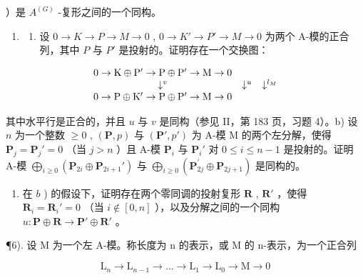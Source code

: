 ）是 \(A^{(G)}\) -复形之间的一个同构。

\begin{enumerate}
\def\labelenumi{\arabic{enumi})}
\setcounter{enumi}{4}
\tightlist
\item
  \begin{enumerate}
  \def\labelenumii{\alph{enumii})}
  \tightlist
  \item
    设 \(0 \to K \to P \to M \to 0\) , \(0 \to K' \to P' \to M \to 0\) 为两个 A-模的正合列，其中 \(P\) 与 \(P'\) 是投射的。证明存在一个交换图：
  \end{enumerate}
\end{enumerate}

\[
\begin{array}{c c c}0 \rightarrow \mathrm{K} \oplus \mathrm{P} ^ {\prime} \rightarrow \mathrm{P} \oplus \mathrm{P} ^ {\prime} \rightarrow \mathrm{M} \rightarrow 0\\\downarrow^ {v}&\downarrow^ {u}&\downarrow^ {l _ {M}}\\0 \rightarrow \mathrm{P} \oplus \mathrm{K} ^ {\prime} \rightarrow \mathrm{P} \oplus \mathrm{P} ^ {\prime} \rightarrow \mathrm{M} \rightarrow 0\end{array}
\]

其中水平行是正合的，并且 \(u\) 与 \(v\) 是同构（参见 II，第 183 页，习题 4）。b) 设 \(n\) 为一个整数 \(\geqslant 0\) , \((\mathbf{P}, p)\) 与 \((\mathbf{P}', p')\) 为 A-模 M 的两个左分解，使得 \(\mathbf{P}_j = \mathbf{P}_j' = 0\) （当 \(j > n\) ）且 A-模 \(\mathbf{P}_i\) 与 \(\mathbf{P}_i'\) 对 \(0 \leqslant i \leqslant n - 1\) 是投射的。证明 A-模 \(\bigoplus_{i \geqslant 0} (\mathbf{P}_{2i} \oplus \mathbf{P}_{2i+1}')\) 与 \(\bigoplus_{i \geqslant 0} (\mathbf{P}_{2j}^{\prime} \oplus \mathbf{P}_{2j+1})\) 是同构的。

\begin{enumerate}
\def\labelenumi{\alph{enumi})}
\setcounter{enumi}{2}
\tightlist
\item
  在 \(b\) ) 的假设下，证明存在两个零同调的投射复形 \(\mathbf{R}\) , \(\mathbf{R}'\) ，使得 \(\mathbf{R}_i = \mathbf{R}_i' = 0\) （当 \(i \notin [0, n]\) ），以及分解之间的一个同构 \(u: \mathbf{P} \oplus \mathbf{R} \to \mathbf{P}' \oplus \mathbf{R}'\) 。
\end{enumerate}

¶6). 设 M 为一个左 A-模。称长度为 n 的表示，或 M 的 n-表示，为一个正合列

\[
\mathrm{L} _ {n} \rightarrow \mathrm{L} _ {n - 1} \rightarrow \dots \rightarrow \mathrm{L} _ {1} \rightarrow \mathrm{L} _ {0} \rightarrow \mathrm{M} \rightarrow 0
\]

